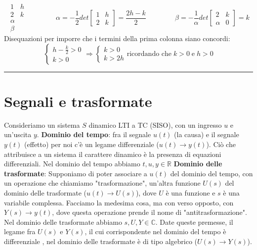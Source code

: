 \[
    \begin{matrix}
        1&h\\
        2&k\\
        \alpha\\
        \beta
    \end{matrix} \;\;\;\;\;\;\;\;\;\;\;\;\;\;\;\alpha = - \frac{1}{2}det \left[\begin{matrix}
        1&h\\2&k
    \end{matrix}\right] = \frac{2h-k}{2} \;\;\;\;\;\;\;\;\;\;\;\;\;\;\; \beta = - \frac{1}{\alpha} det \left[\begin{matrix}
        2 & k \\ \alpha & 0
    \end{matrix}\right] = k
\]
Disequazioni per imporre che i termini della prima colonna siano concordi:
\[
    \begin{cases}
        h - \frac{k}{2}>0\\
        k>0
    \end{cases} \Rightarrow \begin{cases}
        k>0\\
        k>2h
    \end{cases} \text{ricordando che} \; k>0 \;\text{e}\;h>0
\]
\rule{\textwidth}{0,4pt}
\newpage
\section{Segnali e trasformate}
Consideriamo un sistema $S$ dinamico LTI a TC (SISO), con un ingresso $u$ e un'uscita $y$.\newline
{}\newline
\newline
\textbf{Dominio del tempo}: fra il segnale $u(t)$ (la causa) e il segnale $y(t)$ (effetto) per noi c'è un legame differenziale ($u(t) \rightarrow y(t)$). Ciò che attribuisce a un sistema il carattere dinamico è la presenza di equazioni differenziali. Nel dominio del tempo abbiamo $t,u,y \in \mathbb{R}$\newline
\newline
\textbf{Dominio delle trasformate}: Supponiamo di poter associare a $u(t)$ del dominio del tempo, con un operazione che chiamiamo "trasformazione", un'altra funzione $U(s)$ del dominio delle trasformate ($u(t) \rightarrow U(s)$), dove $U$ è una funzione e $s$ è una variabile complessa. Facciamo la medesima cosa, ma con verso opposto, con $Y(s)\rightarrow y(t)$, dove questa operazione prende il nome di "antitrasformazione". Nel dominio delle trasformate abbiamo $s, U ,Y \in \mathbb{C}$.\newline
Date queste premesse, il legame fra $U(s)$ e $Y(s)$, il cui corrispondente nel dominio del tempo è differenziale , nel dominio delle trasformate è di tipo algebrico ($U(s) \rightarrow  Y(s)$).
